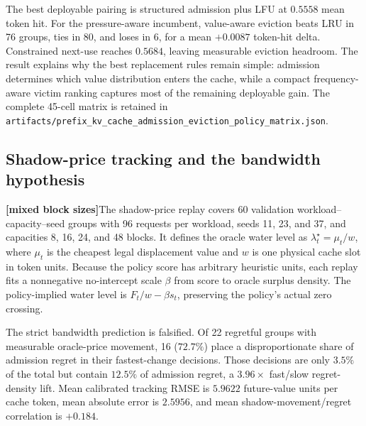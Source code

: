 \documentclass[11pt]{article}
\newcommand{\filepath}[1]{\nolinkurl{#1}}
\newcommand{\mixedblocktag}{\textbf{\color{navy}[mixed block sizes]}}
\begin{document}
The best deployable pairing is structured admission plus LFU at \(0.5558\) mean
token hit.  For the pressure-aware incumbent, value-aware eviction beats LRU in 76
groups, ties in 80, and loses in 6, for a mean \(+0.0087\) token-hit delta.
Constrained next-use reaches \(0.5684\), leaving measurable eviction headroom.  The
result explains why the best replacement rules remain simple: admission determines
which value distribution enters the cache, while a compact frequency-aware victim
ranking captures most of the remaining deployable gain.  The complete 45-cell matrix
is retained in
\filepath{artifacts/prefix_kv_cache_admission_eviction_policy_matrix.json}.

\subsection{Shadow-price tracking and the bandwidth hypothesis}

\mixedblocktag The shadow-price replay covers 60 validation
workload--capacity--seed groups with 96 requests per workload, seeds 11, 23, and 37,
and capacities 8, 16, 24, and 48 blocks.  It defines the oracle water level as
\(\lambda_t^\star=\mu_t/w\), where \(\mu_t\) is the cheapest legal displacement value
and \(w\) is one physical cache slot in token units.  Because the policy score has
arbitrary heuristic units, each replay fits a nonnegative no-intercept scale
\(\beta\) from score to oracle surplus density.  The policy-implied water level is
\(F_t/w-\beta s_t\), preserving the policy's actual zero crossing.

The strict bandwidth prediction is falsified.  Of 22 regretful groups with measurable
oracle-price movement, 16 (\(72.7\%\)) place a disproportionate share of admission
regret in their fastest-change decisions.  Those decisions are only \(3.5\%\) of the
total but contain \(12.5\%\) of admission regret, a \(3.96\times\) fast/slow
regret-density lift.  Mean calibrated tracking RMSE is \(5.9622\) future-value units
per cache token, mean absolute error is \(2.5956\), and mean
shadow-movement/regret correlation is \(+0.184\).
\end{document}
